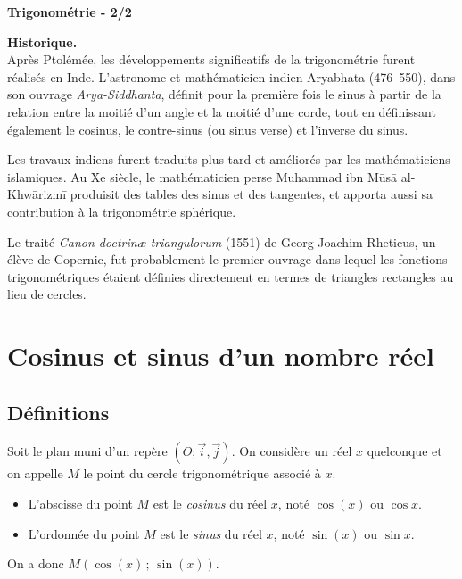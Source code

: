 \documentclass[11pt]{article}
\newenvironment{historique}{\par\smallskip\noindent\textbf{Historique. \\}\ignorespaces}{\par\smallskip}
\begin{document}
\begin{definition}
\begin{center}
    {\Huge\bfseries Trigonométrie - 2/2}
\end{center}
\end{definition}

\begin{historique}
Après Ptolémée, les développements significatifs de la trigonométrie furent réalisés en Inde. L'astronome et mathématicien indien Aryabhata (476--550), dans son ouvrage \emph{Arya-Siddhanta}, définit pour la première fois le sinus à partir de la relation entre la moitié d'un angle et la moitié d'une corde, tout en définissant également le cosinus, le contre-sinus (ou sinus verse) et l'inverse du sinus.

Les travaux indiens furent traduits plus tard et améliorés par les mathématiciens islamiques. Au Xe siècle, le mathématicien perse Muhammad ibn Mūsā al-Khwārizmī produisit des tables des sinus et des tangentes, et apporta aussi sa contribution à la trigonométrie sphérique.

Le traité \emph{Canon doctrinæ triangulorum} (1551) de Georg Joachim Rheticus, un élève de Copernic, fut probablement le premier ouvrage dans lequel les fonctions trigonométriques étaient définies directement en termes de triangles rectangles au lieu de cercles.
\end{historique}

\section{Cosinus et sinus d'un nombre réel}

\subsection{Définitions}

\begin{definition}
Soit le plan muni d'un repère $(O;\vec{i},\vec{j})$. On considère un réel $x$ quelconque et on appelle $M$ le point du cercle trigonométrique associé à $x$.
\begin{itemize}
    \item L'abscisse du point $M$ est le \emph{cosinus} du réel $x$, noté $\cos(x)$ ou $\cos x$.
    \item L'ordonnée du point $M$ est le \emph{sinus} du réel $x$, noté $\sin(x)$ ou $\sin x$.
\end{itemize}
On a donc $M(\cos(x)\,;\,\sin(x))$.
\end{definition}
\end{document}
